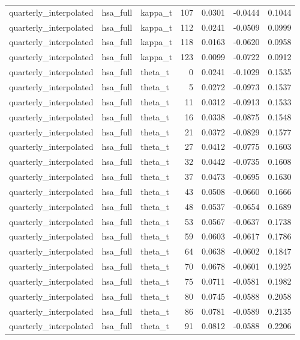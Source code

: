 \begin{tabular}{lllrrrr}
quarterly\_interpolated & hsa\_full & kappa\_t & 107 & 0.0301 & -0.0444 & 0.1044 \\
quarterly\_interpolated & hsa\_full & kappa\_t & 112 & 0.0241 & -0.0509 & 0.0999 \\
quarterly\_interpolated & hsa\_full & kappa\_t & 118 & 0.0163 & -0.0620 & 0.0958 \\
quarterly\_interpolated & hsa\_full & kappa\_t & 123 & 0.0099 & -0.0722 & 0.0912 \\
quarterly\_interpolated & hsa\_full & theta\_t & 0 & 0.0241 & -0.1029 & 0.1535 \\
quarterly\_interpolated & hsa\_full & theta\_t & 5 & 0.0272 & -0.0973 & 0.1537 \\
quarterly\_interpolated & hsa\_full & theta\_t & 11 & 0.0312 & -0.0913 & 0.1533 \\
quarterly\_interpolated & hsa\_full & theta\_t & 16 & 0.0338 & -0.0875 & 0.1548 \\
quarterly\_interpolated & hsa\_full & theta\_t & 21 & 0.0372 & -0.0829 & 0.1577 \\
quarterly\_interpolated & hsa\_full & theta\_t & 27 & 0.0412 & -0.0775 & 0.1603 \\
quarterly\_interpolated & hsa\_full & theta\_t & 32 & 0.0442 & -0.0735 & 0.1608 \\
quarterly\_interpolated & hsa\_full & theta\_t & 37 & 0.0473 & -0.0695 & 0.1630 \\
quarterly\_interpolated & hsa\_full & theta\_t & 43 & 0.0508 & -0.0660 & 0.1666 \\
quarterly\_interpolated & hsa\_full & theta\_t & 48 & 0.0537 & -0.0654 & 0.1689 \\
quarterly\_interpolated & hsa\_full & theta\_t & 53 & 0.0567 & -0.0637 & 0.1738 \\
quarterly\_interpolated & hsa\_full & theta\_t & 59 & 0.0603 & -0.0617 & 0.1786 \\
quarterly\_interpolated & hsa\_full & theta\_t & 64 & 0.0638 & -0.0602 & 0.1847 \\
quarterly\_interpolated & hsa\_full & theta\_t & 70 & 0.0678 & -0.0601 & 0.1925 \\
quarterly\_interpolated & hsa\_full & theta\_t & 75 & 0.0711 & -0.0581 & 0.1982 \\
quarterly\_interpolated & hsa\_full & theta\_t & 80 & 0.0745 & -0.0588 & 0.2058 \\
quarterly\_interpolated & hsa\_full & theta\_t & 86 & 0.0781 & -0.0589 & 0.2135 \\
quarterly\_interpolated & hsa\_full & theta\_t & 91 & 0.0812 & -0.0588 & 0.2206 \\

\end{tabular}
